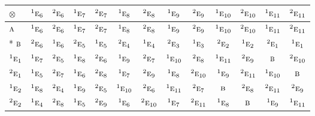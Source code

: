 \documentclass[10pt,a4paper]{article}
\numberwithin{equation}{section}
\newcommand{\irr}[1]{\text{\normalfont\scshape #1}}
\newcommand{\conjpair}[1]{{}^{#1}}
\newcommand{\irrprod}{\otimes}
\begin{document}
{\small\setlength{\tabcolsep}{3pt}\begin{longtable}{@{}lcccccccccccc@{}}\toprule
$\irrprod$ & $\conjpair{1}\irr{e}_{6}$ & $\conjpair{2}\irr{e}_{6}$ & $\conjpair{1}\irr{e}_{7}$ & $\conjpair{2}\irr{e}_{7}$ & $\conjpair{1}\irr{e}_{8}$ & $\conjpair{2}\irr{e}_{8}$ & $\conjpair{1}\irr{e}_{9}$ & $\conjpair{2}\irr{e}_{9}$ & $\conjpair{1}\irr{e}_{10}$ & $\conjpair{2}\irr{e}_{10}$ & $\conjpair{1}\irr{e}_{11}$ & $\conjpair{2}\irr{e}_{11}$\\\midrule\endhead
\bottomrule\endfoot\endlastfoot
$\irr{a}$ & $\conjpair{1}\irr{e}_{6}$ & $\conjpair{2}\irr{e}_{6}$ & $\conjpair{1}\irr{e}_{7}$ & $\conjpair{2}\irr{e}_{7}$ & $\conjpair{1}\irr{e}_{8}$ & $\conjpair{2}\irr{e}_{8}$ & $\conjpair{1}\irr{e}_{9}$ & $\conjpair{2}\irr{e}_{9}$ & $\conjpair{1}\irr{e}_{10}$ & $\conjpair{2}\irr{e}_{10}$ & $\conjpair{1}\irr{e}_{11}$ & $\conjpair{2}\irr{e}_{11}$\\*
$\irr{b}$ & $\conjpair{2}\irr{e}_{6}$ & $\conjpair{1}\irr{e}_{6}$ & $\conjpair{2}\irr{e}_{5}$ & $\conjpair{1}\irr{e}_{5}$ & $\conjpair{2}\irr{e}_{4}$ & $\conjpair{1}\irr{e}_{4}$ & $\conjpair{2}\irr{e}_{3}$ & $\conjpair{1}\irr{e}_{3}$ & $\conjpair{2}\irr{e}_{2}$ & $\conjpair{1}\irr{e}_{2}$ & $\conjpair{2}\irr{e}_{1}$ & $\conjpair{1}\irr{e}_{1}$\\
$\conjpair{1}\irr{e}_{1}$ & $\conjpair{1}\irr{e}_{7}$ & $\conjpair{2}\irr{e}_{5}$ & $\conjpair{1}\irr{e}_{8}$ & $\conjpair{2}\irr{e}_{6}$ & $\conjpair{1}\irr{e}_{9}$ & $\conjpair{2}\irr{e}_{7}$ & $\conjpair{1}\irr{e}_{10}$ & $\conjpair{2}\irr{e}_{8}$ & $\conjpair{1}\irr{e}_{11}$ & $\conjpair{2}\irr{e}_{9}$ & $\irr{b}$ & $\conjpair{2}\irr{e}_{10}$\\
$\conjpair{2}\irr{e}_{1}$ & $\conjpair{1}\irr{e}_{5}$ & $\conjpair{2}\irr{e}_{7}$ & $\conjpair{1}\irr{e}_{6}$ & $\conjpair{2}\irr{e}_{8}$ & $\conjpair{1}\irr{e}_{7}$ & $\conjpair{2}\irr{e}_{9}$ & $\conjpair{1}\irr{e}_{8}$ & $\conjpair{2}\irr{e}_{10}$ & $\conjpair{1}\irr{e}_{9}$ & $\conjpair{2}\irr{e}_{11}$ & $\conjpair{1}\irr{e}_{10}$ & $\irr{b}$\\
$\conjpair{1}\irr{e}_{2}$ & $\conjpair{1}\irr{e}_{8}$ & $\conjpair{2}\irr{e}_{4}$ & $\conjpair{1}\irr{e}_{9}$ & $\conjpair{2}\irr{e}_{5}$ & $\conjpair{1}\irr{e}_{10}$ & $\conjpair{2}\irr{e}_{6}$ & $\conjpair{1}\irr{e}_{11}$ & $\conjpair{2}\irr{e}_{7}$ & $\irr{b}$ & $\conjpair{2}\irr{e}_{8}$ & $\conjpair{2}\irr{e}_{11}$ & $\conjpair{2}\irr{e}_{9}$\\
$\conjpair{2}\irr{e}_{2}$ & $\conjpair{1}\irr{e}_{4}$ & $\conjpair{2}\irr{e}_{8}$ & $\conjpair{1}\irr{e}_{5}$ & $\conjpair{2}\irr{e}_{9}$ & $\conjpair{1}\irr{e}_{6}$ & $\conjpair{2}\irr{e}_{10}$ & $\conjpair{1}\irr{e}_{7}$ & $\conjpair{2}\irr{e}_{11}$ & $\conjpair{1}\irr{e}_{8}$ & $\irr{b}$ & $\conjpair{1}\irr{e}_{9}$ & $\conjpair{1}\irr{e}_{11}$\\

\end{longtable}}
\end{document}
